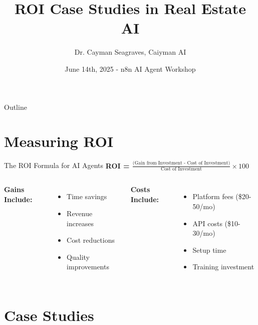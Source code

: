 \documentclass{beamer}
\author{Dr. Cayman Seagraves, Caiyman AI}
\date{June 14th, 2025 - n8n AI Agent Workshop}
\title{ROI Case Studies in Real Estate AI}
\begin{document}
{
\begin{frame}
    \titlepage
\end{frame}
}

\begin{frame}{Outline}
    \tableofcontents
\end{frame}

\section{Measuring ROI}

\begin{frame}{The ROI Formula for AI Agents}
  \Large
  \centering
  \textbf{ROI = $\frac{\text{(Gain from Investment - Cost of Investment)}}{\text{Cost of Investment}} \times 100$}
  
  \vspace{0.5cm}
  
  \normalsize
  \begin{columns}[onlytextwidth]
      \textbf{Gains Include:}
      \begin{itemize}
        \item Time savings
        \item Revenue increases
        \item Cost reductions
        \item Quality improvements
      \end{itemize}
    
      \textbf{Costs Include:}
      \begin{itemize}
        \item Platform fees (\$20-50/mo)
        \item API costs (\$10-30/mo)
        \item Setup time
        \item Training investment
      \end{itemize}
  \end{columns}
\end{frame}

\section{Case Studies}
\end{document}
